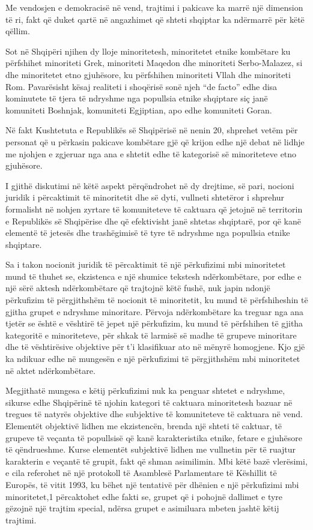 \documentclass[a4paper]{article}
\begin{document}
Me vendosjen e demokracisë në vend, trajtimi i pakicave ka marrë një  dimension të ri, fakt që duket qartë në angazhimet që shteti shqiptar ka  ndërmarrë për këtë qëllim. 

Sot në Shqipëri njihen dy lloje minoritetesh, minoritetet etnike  kombëtare ku përfshihet minoriteti Grek, minoriteti Maqedon dhe minoriteti  Serbo-Malazez, si dhe minoritetet etno gjuhësore, ku përfshihen minoriteti  Vllah dhe minoriteti Rom. Pavarësisht kësaj realiteti i shoqërisë sonë njeh “de  facto” edhe disa kominutete të tjera të ndryshme nga popullsia etnike shqiptare  siç janë komuniteti Boshnjak, komuniteti Egjiptian, apo edhe komuniteti Goran.  

Në fakt Kushtetuta e Republikës së Shqipërisë në nenin 20, shprehet  vetëm për personat që u përkasin pakicave kombëtare gjë që krijon edhe një  debat në lidhje me njohjen e zgjeruar nga ana e shtetit edhe të kategorisë së  minoriteteve etno gjuhësore.

I gjithë diskutimi në këtë aspekt përqëndrohet në dy drejtime, së pari,  nocioni juridik i përcaktimit të minoritetit dhe së dyti, vullneti shtetëror i  shprehur formalisht në nohjen zyrtare të komuniteteve të caktuara që jetojnë  në territorin e Republikës së Shqipërise dhe që efektivisht janë shtetas  shqiptarë, por që kanë elementë të jetesës dhe trashëgimisë të tyre të  ndryshme nga popullsia etnike shqiptare. 

Sa i takon nocionit juridik të përcaktimit të një përkufizimi mbi minoritetet  mund të thuhet se, ekzistenca e një shumice tekstesh ndërkombëtare, por  edhe e një sërë aktesh ndërkombëtare që trajtojnë këtë fushë, nuk japin ndonjë  përkufizim të përgjithshëm të nocionit të minoritetit, ku mund të përfshiheshin  të gjitha grupet e ndryshme minoritare. Përvoja ndërkombëtare ka treguar nga  ana tjetër se është e vështirë të jepet një përkufizim, ku mund të përfshihen të  gjitha kategoritë e minoriteteve, për shkak të larmisë së madhe të grupeve  minoritare dhe të vështirësive objektive për t’i klasifikuar ato në mënyrë  homogjene. Kjo gjë ka ndikuar edhe në mungesën e një përkufizimi të  përgjithshëm mbi minoritetet në aktet ndërkombëtare.

Megjithatë mungesa e këtij përkufizimi nuk ka penguar shtetet e  ndryshme, sikurse edhe Shqipërinë të njohin kategori të caktuara minoritetesh  bazuar në tregues të natyrës objektive dhe subjektive të komuniteteve të  caktuara në vend. Elementët objektivë lidhen me ekzistencën, brenda një  shteti të caktuar, të grupeve të veçanta të popullsisë që kanë karakteristika  etnike, fetare e gjuhësore të qëndrueshme. Kurse elementët subjektivë lidhen  me vullnetin për të ruajtur karakterin e veçantë të grupit, fakt që shman asimilimin. Mbi këtë bazë vlerësimi, e cila referohet në një protokoll të  Asamblesë Parlamentare të Këshillit të Europës, të vitit 1993, ku bëhet një  tentativë për dhënien e një përkufizimi mbi minoritetet,1 përcaktohet edhe fakti  se, grupet që i pohojnë dallimet e tyre gëzojnë një trajtim special, ndërsa grupet  e asimiluara mbeten jashtë këtij trajtimi. 
\end{document}
